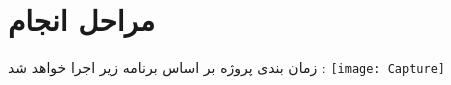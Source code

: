 \documentclass[paper=a4, fontsize=11pt]{article}
\begin{document}
\section*{\LARGE مراحل انجام }
\par
زمان بندی پروژه بر اساس برنامه زیر اجرا خواهد شد :
\newline
\newline
\texttt{[image: Capture]}
\end{document}
